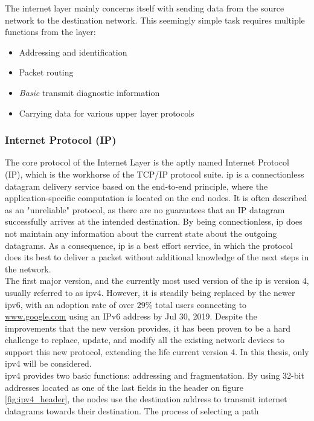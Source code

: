 The internet layer mainly concerns itself with sending data from the source
network to the destination network. This seemingly simple task requires multiple
functions from the layer:
\begin{itemize}
    \item Addressing and identification
    \item Packet routing
    \item \emph{Basic} transmit diagnostic information
    \item Carrying data for various upper layer protocols
\end{itemize}

\subsubsection{Internet Protocol (IP)}
The core protocol of the Internet Layer is the aptly named Internet Protocol
(IP), which is the workhorse of the TCP/IP protocol suite.
\gls{ip} is a connectionless datagram delivery service based on the
end-to-end principle, where the application-specific computation is located on
the end nodes. It is often described as an "unreliable" protocol, as there are
no guarantees that an IP datagram successfully arrives at the intended
destination. By being connectionless, \gls{ip} does not maintain any
information about the current state about the outgoing datagrams.
As a consequence, \gls{ip} is a best effort service, in which the protocol does
its best to deliver a packet without additional knowledge of the next steps in
the network\cite{tcpip_illustrated_vol1}.\\
The first major version, and the currently most used version of the \gls{ip}
is version 4, usually referred to as \gls{ipv4}. However, it is steadily
being replaced by the newer \gls{ipv6}, with an adoption rate of over $29\%$
total users connecting to \url{www.google.com} using an IPv6 address by Jul
30, 2019\cite{google_ipv6_adoption}. Despite the improvements that the new
version provides, it has been proven to be a hard challenge to replace, update,
and modify all the existing network devices to support this new protocol,
extending the life current version 4. In this thesis, only \gls{ipv4} will
be considered.\\
\gls{ipv4} provides two basic functions: addressing and fragmentation. By using
32-bit addresses located as one of the last fields in the header on figure
\ref{fig:ipv4_header}, the nodes use the destination address to transmit
internet datagrams towards their destination. The process of selecting a path
